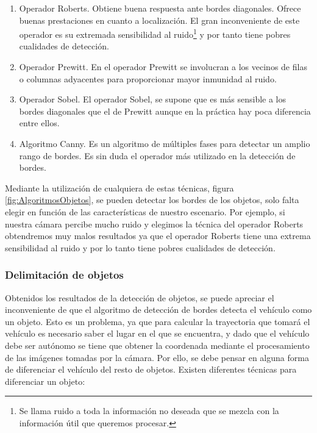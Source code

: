 \begin{enumerate}
\item Operador Roberts. Obtiene buena respuesta ante bordes diagonales. Ofrece buenas prestaciones en cuanto a localización. El gran inconveniente de este operador es su extremada sensibilidad al ruido\footnote{Se llama ruido a toda la información no deseada que se mezcla con la información útil que queremos procesar.} y por tanto tiene pobres cualidades de detección. \cite{OperadoresDeteccion} 
\item Operador Prewitt. En el operador Prewitt se involucran a los vecinos de filas o  columnas adyacentes para proporcionar mayor inmunidad al ruido. \cite{OperadoresDeteccion}
\item Operador Sobel. El operador Sobel, se supone que es más sensible a los bordes diagonales que el de Prewitt aunque en la práctica hay poca diferencia entre ellos. \cite{OperadoresDeteccion}
\item Algoritmo Canny. Es un algoritmo de múltiples fases para detectar un amplio rango de bordes. Es sin duda el operador más utilizado en la detección de bordes.\cite{Canny}
\end{enumerate}

Mediante la utilización de cualquiera de estas técnicas, figura \ref{fig:AlgoritmosObjetos}, se pueden detectar los bordes de los objetos, solo falta elegir en función de las características de nuestro escenario. Por ejemplo, si nuestra cámara percibe mucho ruido y elegimos la técnica del operador Roberts obtendremos muy malos resultados ya que el operador Roberts tiene una extrema sensibilidad al ruido y por lo tanto tiene pobres cualidades de detección.

\subsubsection{Delimitación de objetos}

Obtenidos los resultados de la detección de objetos, se puede apreciar el inconveniente de que el algoritmo de detección de bordes detecta el vehículo como un objeto. Esto es un problema, ya que para calcular la trayectoria que tomará el vehículo es necesario saber  el lugar en el que se encuentra, y dado que el vehículo debe ser autónomo se tiene que obtener la coordenada mediante el procesamiento de las imágenes tomadas por la cámara. Por ello, se debe pensar en alguna forma de diferenciar el vehículo del resto de objetos. Existen diferentes técnicas para diferenciar un objeto:

